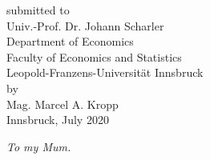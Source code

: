 \documentclass[a4paper,11pt,listof=nochaptergap,oneside,pointednumbers,bibtotoc,bigheadings,liststotoc,hidelinks]{scrbook}
\theoremstyle{mysatz}
\theoremstyle{mydefinition}
\theoremstyle{mytheorem}
\theoremstyle{mybemerkung}
\begin{document}
\begin{titlepage}
\begin{center}
        submitted to\\
        Univ.-Prof. Dr. Johann Scharler \\[10mm]
        Department of Economics\\
        Faculty of Economics and Statistics\\
        Leopold-Franzens-Universität Innsbruck \\[10mm]
        by \\ Mag. Marcel A. Kropp \\[10mm]
        Innsbruck, July 2020
    \end{center}
\end{titlepage}

\restoregeometry

\thispagestyle{empty} %
\null{}
    \begin{flushright}
       \large \textit{To my Mum.}\\
    \end{flushright}
\null
\end{document}
